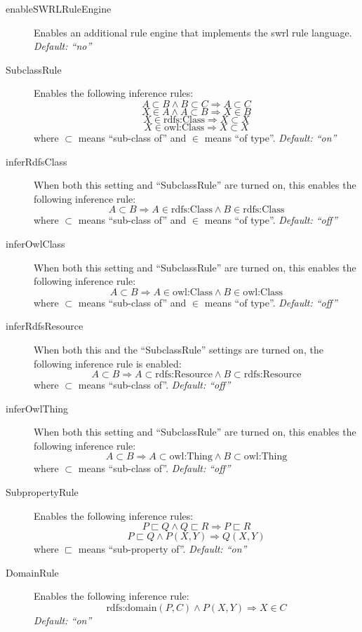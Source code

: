 \begin{description}
	\item[enableSWRLRuleEngine] Enables an additional rule engine that implements the \ac{swrl} rule language. \emph{Default: ``no''}

	\item[SubclassRule] Enables the following inference rules:
\[A \subset B \land B \subset C \Rightarrow A \subset C\]
\[X \in A \land A \subset B \Rightarrow X \in B\]
\[X \in \text{rdfs:Class} \Rightarrow X \subset X\]
\[X \in \text{owl:Class} \Rightarrow X \subset X\]
where $\subset$ means ``sub-class of'' and $\in$ means ``of type''. \emph{Default: ``on''}

	\item[inferRdfsClass] When both this setting and ``SubclassRule'' are turned on, this enables the following inference rule:
\[A \subset B \Rightarrow A \in \text{rdfs:Class} \land B \in \text{rdfs:Class}\]
where $\subset$ means ``sub-class of'' and $\in$ means ``of type''. \emph{Default: ``off''}

	\item[inferOwlClass] When both this setting and ``SubclassRule'' are turned on, this enables the following inference rule:
\[A \subset B \Rightarrow A \in \text{owl:Class} \land B \in \text{owl:Class}\]
where $\subset$ means ``sub-class of'' and $\in$ means ``of type''. \emph{Default: ``off''}

	\item[inferRdfsResource] When both this and the ``SubclassRule'' settings are turned on, the following inference rule is enabled:
\[A \subset B \Rightarrow A \subset \text{rdfs:Resource} \land B \subset \text{rdfs:Resource}\]
where $\subset$ means ``sub-class of''. \emph{Default: ``off''}

	\item[inferOwlThing] When both this setting and ``SubclassRule'' are turned on, this enables the following inference rule:
\[A \subset B \Rightarrow A \subset \text{owl:Thing} \land B \subset \text{owl:Thing}\]
where $\subset$ means ``sub-class of''. \emph{Default: ``off''}

	\item[SubpropertyRule] Enables the following inference rules:
\[P \sqsubset Q \land Q \sqsubset R \Rightarrow P \sqsubset R\]
\[P \sqsubset Q \land P(X, Y) \Rightarrow Q(X, Y)\]
where $\sqsubset$ means ``sub-property of''. \emph{Default: ``on''}

	\item[DomainRule] Enables the following inference rule:
\[\text{rdfs:domain}(P,C) \land P(X, Y) \Rightarrow X \in C\]
\emph{Default: ``on''}


\end{description}

